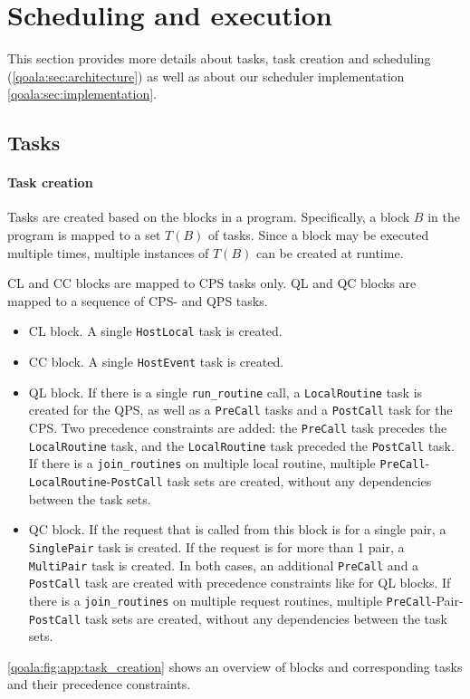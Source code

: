 \section{Scheduling and execution}
\label{qoala:sec:app:scheduling_execution}
This section provides more details about tasks, task creation and scheduling (\cref{qoala:sec:architecture}) as well as about our scheduler implementation \cref{qoala:sec:implementation}.

\subsection{Tasks}

\paragraph{Task creation}
\label{qoala:sec:app:scheduling_execution_task_creation}

Tasks are created based on the blocks in a program.
Specifically, a block $B$ in the program is mapped to a set $T(B)$ of tasks.
Since a block may be executed multiple times, multiple instances of $T(B)$ can be created at runtime.

CL and CC blocks are mapped to CPS tasks only.
QL and QC blocks are mapped to a sequence of CPS- and QPS tasks.
\begin{itemize}
    \item CL block. A single \texttt{HostLocal} task is created.
    \item CC block. A single \texttt{HostEvent} task is created.
    \item QL block. If there is a single \texttt{run\_routine} call, a \texttt{LocalRoutine} task is created for the QPS, as well as a \texttt{PreCall} tasks and a \texttt{PostCall} task for the CPS.
    Two precedence constraints are added: the \texttt{PreCall} task precedes the \texttt{LocalRoutine} task, and the \texttt{LocalRoutine} task preceded the \texttt{PostCall} task.
    If there is a \texttt{join\_routines} on multiple local routine, multiple \texttt{PreCall}-\texttt{LocalRoutine}-\texttt{PostCall} task sets are created, without any dependencies between the task sets.
    \item QC block. If the request that is called from this block is for a single pair,
    a \texttt{SinglePair} task is created. If the request is for more than 1 pair, a \texttt{MultiPair} task is created. In both cases, an additional \texttt{PreCall} and a \texttt{PostCall} task are created with precedence constraints like for QL blocks.
    If there is a \texttt{join\_routines} on multiple request routines, multiple \texttt{PreCall}-Pair-\texttt{PostCall} task sets are created, without any dependencies between the task sets.
\end{itemize}
\cref{qoala:fig:app:task_creation} shows an overview of blocks and corresponding tasks and their precedence constraints.


